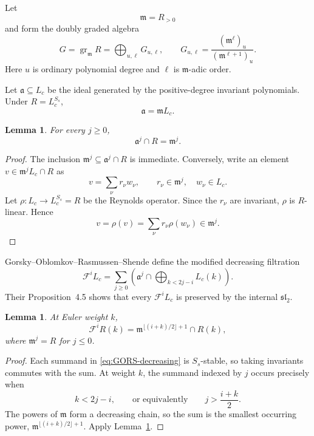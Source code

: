\documentclass[11pt]{article}
\newtheorem{lemma}[theorem]{Lemma}
\newcommand{\gr}{\operatorname{gr}}
\begin{document}
Let
\[
 \mathfrak m=R_{>0}
\]
and form the doubly graded algebra
\[
 G=\gr_{\mathfrak m}R
 =\bigoplus_{u,\ell}G_{u,\ell},
 \qquad
 G_{u,\ell}
 =\frac{(\mathfrak m^\ell)_u}{(\mathfrak m^{\ell+1})_u}.
\]
Here $u$ is ordinary polynomial degree and $\ell$ is
$\mathfrak m$-adic order.

Let $\mathfrak a\subseteq L_c$ be the ideal generated by the
positive-degree invariant polynomials.  Under $R=L_c^{S_s}$,
\[
 \mathfrak a=\mathfrak mL_c.
\]

\begin{lemma}\label{lem:intersection}
For every $j\geq0$,
\begin{equation}\label{eq:intersection}
 \mathfrak a^j\cap R=\mathfrak m^j.
\end{equation}
\end{lemma}

\begin{proof}
The inclusion $\mathfrak m^j\subseteq\mathfrak a^j\cap R$ is
immediate.  Conversely, write an element
$v\in\mathfrak m^jL_c\cap R$ as
\[
 v=\sum_\nu r_\nu w_\nu,
 \qquad r_\nu\in\mathfrak m^j,
 \quad w_\nu\in L_c.
\]
Let $\rho:L_c\to L_c^{S_s}=R$ be the Reynolds operator.  Since the
$r_\nu$ are invariant, $\rho$ is $R$-linear.  Hence
\[
 v=\rho(v)=\sum_\nu r_\nu\rho(w_\nu)\in\mathfrak m^j.
\]
\end{proof}

Gorsky--Oblomkov--Rasmussen--Shende define the modified decreasing
filtration
\begin{equation}\label{eq:GORS-decreasing}
 \mathcal F^iL_c
 =\sum_{j\geq0}
 \left(
 \mathfrak a^j\cap
 \bigoplus_{k<2j-i}L_c(k)
 \right).
\end{equation}
Their Proposition~4.5 shows that every $\mathcal F^iL_c$ is preserved
by the internal $\mathfrak{sl}_2$.

\begin{lemma}\label{lem:restricted-filtration}
At Euler weight $k$,
\begin{equation}\label{eq:restricted-filtration}
 \mathcal F^iR(k)
 =\mathfrak m^{\lfloor(i+k)/2\rfloor+1}\cap R(k),
\end{equation}
where $\mathfrak m^j=R$ for $j\leq0$.
\end{lemma}

\begin{proof}
Each summand in \eqref{eq:GORS-decreasing} is $S_s$-stable, so taking
invariants commutes with the sum.  At weight $k$, the summand indexed
by $j$ occurs precisely when
\[
 k<2j-i,
 \qquad\text{or equivalently}\qquad
 j>\frac{i+k}{2}.
\]
The powers of $\mathfrak m$ form a decreasing chain, so the sum is the
smallest occurring power,
$\mathfrak m^{\lfloor(i+k)/2\rfloor+1}$.  Apply
Lemma~\ref{lem:intersection}.
\end{proof}
\end{document}
